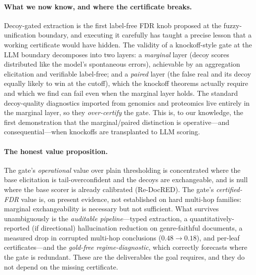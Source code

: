 \documentclass[11pt,letterpaper]{article}
\begin{document}
\paragraph{What we now know, and where the certificate breaks.} Decoy-gated extraction is the first label-free FDR knob proposed at the fuzzy-unification boundary, and executing it carefully has taught a precise lesson that a working certificate would have hidden. The validity of a knockoff-style gate at the LLM boundary decomposes into two layers: a \emph{marginal} layer (decoy scores distributed like the model's spontaneous errors), achievable by an aggregation elicitation and verifiable label-free; and a \emph{paired} layer (the false real and its decoy equally likely to win at the cutoff), which the knockoff theorems actually require and which we find can fail even when the marginal layer holds. The standard decoy-quality diagnostics imported from genomics and proteomics live entirely in the marginal layer, so they \emph{over-certify} the gate. This is, to our knowledge, the first demonstration that the marginal/paired distinction is operative---and consequential---when knockoffs are transplanted to LLM scoring.

\paragraph{The honest value proposition.} The gate's \emph{operational} value over plain thresholding is concentrated where the base elicitation is tail-overconfident and the decoys are exchangeable, and is null where the base scorer is already calibrated (Re-DocRED). The gate's \emph{certified-FDR} value is, on present evidence, not established on hard multi-hop families: marginal exchangeability is necessary but not sufficient. What survives unambiguously is the \emph{auditable pipeline}---typed extraction, a quantitatively-reported (if directional) hallucination reduction on genre-faithful documents, a measured drop in corrupted multi-hop conclusions ($0.48\to0.18$), and per-leaf certificates---and the \emph{gold-free regime-diagnostic}, which correctly forecasts where the gate is redundant. These are the deliverables the goal requires, and they do not depend on the missing certificate.
\end{document}
